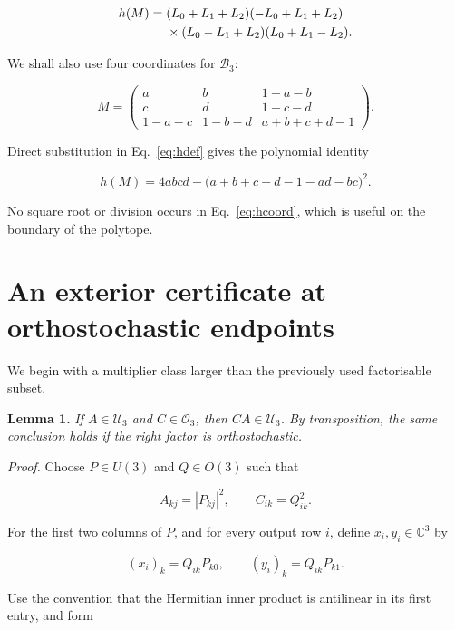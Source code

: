 \documentclass[aip,jmp,amsmath,amssymb,preprint,nofootinbib]{revtex4-2}
\newcommand{\Bd}{\mathcal{B}_3}
\newcommand{\Ud}{\mathcal{U}_3}
\newcommand{\Od}{\mathcal{O}_3}
\begin{document}
\begin{align}
 h(M)={}&(L_0+L_1+L_2)(-L_0+L_1+L_2)\notag\\
 &\times(L_0-L_1+L_2)(L_0+L_1-L_2).
 \label{eq:heron}
\end{align}

We shall also use four coordinates for $\Bd$:

\begin{equation}
 M=\begin{pmatrix}
 a&b&1-a-b\\
 c&d&1-c-d\\
 1-a-c&1-b-d&a+b+c+d-1
 \end{pmatrix}.
 \label{eq:fourcoord}
\end{equation}

Direct substitution in Eq.~\eqref{eq:hdef} gives the polynomial identity

\begin{equation}
 h(M)=4abcd-\bigl(a+b+c+d-1-ad-bc\bigr)^2.
 \label{eq:hcoord}
\end{equation}

No square root or division occurs in Eq.~\eqref{eq:hcoord}, which is useful
on the boundary of the polytope.

\section{An exterior certificate at orthostochastic endpoints}
\label{sec:exterior}

We begin with a multiplier class larger than the previously used
factorisable subset.

\medskip
\noindent\textbf{Lemma 1.}
\emph{If $A\in\Ud$ and $C\in\Od$, then $CA\in\Ud$.  By transposition, the
same conclusion holds if the right factor is orthostochastic.}

\medskip
\noindent\textit{Proof.}
Choose $P\in U(3)$ and $Q\in O(3)$ such that

\begin{equation}
 A_{kj}=|P_{kj}|^2,\qquad C_{ik}=Q_{ik}^2.
 \label{eq:realizers}
\end{equation}

For the first two columns of $P$, and for every output row $i$, define
$x_i,y_i\in\mathbb C^3$ by

\begin{equation}
 (x_i)_k=Q_{ik}P_{k0},\qquad (y_i)_k=Q_{ik}P_{k1}.
 \label{eq:xy}
\end{equation}

Use the convention that the Hermitian inner product is antilinear in its
first entry, and form
\end{document}
